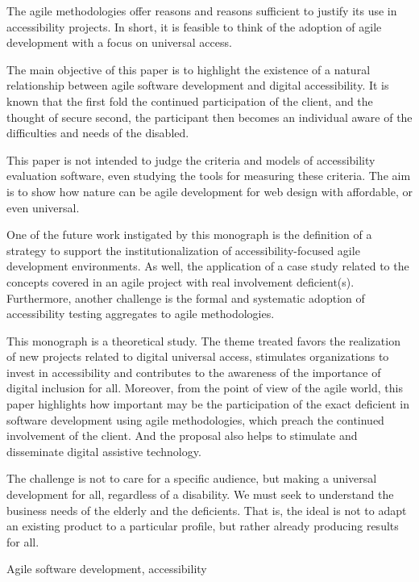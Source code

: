 The agile methodologies offer reasons and reasons sufficient to justify its use in accessibility projects. In short, it is feasible to think of the adoption of agile development with a focus on universal access.

The main objective of this paper is to highlight the existence of a natural relationship between agile software development and digital accessibility. It is known that the first fold the continued participation of the client, and the thought of secure second, the participant then becomes an individual aware of the difficulties and needs of the disabled.

This paper is not intended to judge the criteria and models of accessibility evaluation software, even studying the tools for measuring these criteria. The aim is to show how nature can be agile development for web design with affordable, or even universal.

One of the future work instigated by this monograph is the definition of a strategy to support the institutionalization of accessibility-focused agile development environments. As well, the application of a case study related to the concepts covered in an agile project with real involvement deficient(s). Furthermore, another challenge is the formal and systematic adoption of accessibility testing aggregates to agile methodologies.

This monograph is a theoretical study. The theme treated favors the realization of new projects related to digital universal access, stimulates organizations to invest in accessibility and contributes to the awareness of the importance of digital inclusion for all. Moreover, from the point of view of the agile world, this paper highlights how important may be the participation of the exact deficient in software development using agile methodologies, which preach the continued involvement of the client. And the proposal also helps to stimulate and disseminate digital assistive technology.

The challenge is not to care for a specific audience, but making a universal development for all, regardless of a disability. We must seek to understand the business needs of the elderly and the deficients. That is, the ideal is not to adapt an existing product to a particular profile, but rather already producing results for all.

\begin{keywords}

Agile software development, accessibility

\end{keywords}
